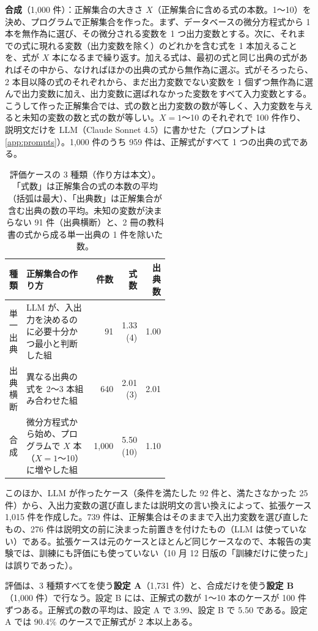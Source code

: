\documentclass[11pt,a4paper]{ltjsarticle}
\begin{document}
\textbf{合成}（1{,}000 件）：正解集合の大きさ $X$（正解集合に含める式の本数。1〜10）を決め、プログラムで正解集合を作った。まず、データベースの微分方程式から 1 本を無作為に選び、その微分される変数を 1 つ出力変数とする。次に、それまでの式に現れる変数（出力変数を除く）のどれかを含む式を 1 本加えることを、式が $X$ 本になるまで繰り返す。加える式は、最初の式と同じ出典の式があればその中から、なければほかの出典の式から無作為に選ぶ。式がそろったら、2 本目以降の式のそれぞれから、まだ出力変数でない変数を 1 個ずつ無作為に選んで出力変数に加え、出力変数に選ばれなかった変数をすべて入力変数とする。こうして作った正解集合では、式の数と出力変数の数が等しく、入力変数を与えると未知の変数の数と式の数が等しい。$X = 1$〜10 のそれぞれで 100 件作り、説明文だけを LLM（Claude Sonnet 4.5）に書かせた（プロンプトは\ref{app:prompts}）。1{,}000 件のうち 959 件は、正解式がすべて 1 つの出典の式である。

\begin{table}[t]\centering
\small
\caption{評価ケースの 3 種類（作り方は本文）。「式数」は正解集合の式の本数の平均（括弧は最大）、「出典数」は正解集合が含む出典の数の平均。未知の変数が決まらない 91 件（出典横断）と、2 冊の教科書の式から成る単一出典の 1 件を除いた数。}
\label{tab:cases}
\begin{tabular}{@{}lp{0.52\linewidth}rrr@{}}
\toprule
種類 & 正解集合の作り方 & 件数 & 式数 & 出典数 \\
\midrule
単一出典 & LLM が、入出力を決めるのに必要十分かつ最小と判断した組 & 91 & 1.33 (4) & 1.00 \\
出典横断 & 異なる出典の式を 2〜3 本組み合わせた組 & 640 & 2.01 (3) & 2.01 \\
合成 & 微分方程式から始め、プログラムで $X$ 本（$X = 1$〜10）に増やした組 & 1{,}000 & 5.50 (10) & 1.10 \\
\bottomrule
\end{tabular}
\end{table}

このほか、LLM が作ったケース（条件を満たした 92 件と、満たさなかった 25 件）から、入出力変数の選び直しまたは説明文の言い換えによって、拡張ケース 1{,}015 件を作成した。739 件は、正解集合はそのままで入出力変数を選び直したもの、276 件は説明文の前に決まった前置きを付けたもの（LLM は使っていない）である。拡張ケースは元のケースとほとんど同じケースなので、本報告の実験では、訓練にも評価にも使っていない（10 月 12 日版の「訓練だけに使った」は誤りであった）。

評価は、3 種類すべてを使う\textbf{設定 A}（1{,}731 件）と、合成だけを使う\textbf{設定 B}（1{,}000 件）で行なう。設定 B には、正解式の数が 1〜10 本のケースが 100 件ずつある。正解式の数の平均は、設定 A で 3.99、設定 B で 5.50 である。設定 A では 90.4\% のケースで正解式が 2 本以上ある。
\end{document}
